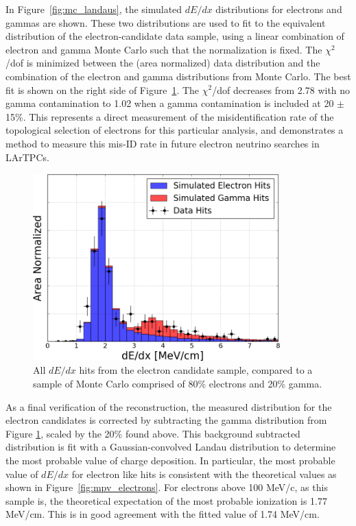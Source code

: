 In Figure~\ref{fig:mc_landaus}, the simulated $dE/dx$ distributions for electrons and gammas are shown.  These two distributions are used to fit to the equivalent distribution of the electron-candidate data sample, using a linear combination of electron and gamma Monte Carlo such that the normalization is fixed.  The $\chi^2$/dof is minimized between the (area normalized) data distribution and the combination of the electron and gamma distributions from Monte Carlo.  The best fit is shown on the right side of Figure~\ref{fig:electron_landau}.  The $\chi^2$/dof decreases from 2.78 with no gamma contamination to 1.02 when a gamma contamination is included at 20 $\pm$ 15\%.  This represents a direct measurement of the misidentification rate of the topological selection of electrons for this particular analysis, and demonstrates a method to measure this mis-ID rate in future electron neutrino searches in LArTPCs.

\begin{figure}[htb]
  \centering
  \includegraphics[width=0.85\textwidth]{emshower_figures/fitted_electron_distribution_trimmed.png}
  \caption{All $dE/dx$ hits from the electron candidate sample, compared to a sample of Monte Carlo comprised of 80\% electrons and 20\% gamma.}
  \label{fig:electron_landau}
\end{figure} 


As a final verification of the reconstruction, the measured distribution for the electron candidates is corrected by subtracting the gamma distribution from Figure \ref{fig:electron_landau}, scaled by the 20\% found above.  This background subtracted distribution is fit with a Gaussian-convolved Landau distribution to determine the most probable value of charge deposition.  In particular, the most probable value of $dE/dx$ for electron like hits is consistent with the theoretical values as shown in Figure~\ref{fig:mpv_electrons}. For electrons above 100 MeV/c, as this sample is, the theoretical expectation of the most probable ionization is 1.77 MeV/cm.  This is in good agreement with the fitted value of 1.74 MeV/cm.

